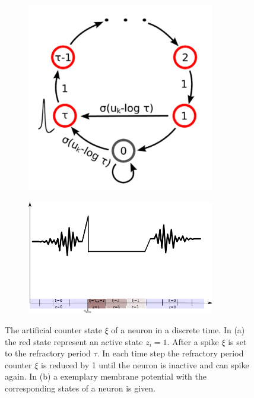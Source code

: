 \begin{figure}
	\centering
	\begin{subfigure}[t]{.39\textwidth}
  		\centering
  		\includegraphics[width=0.9\textwidth]{imgs/snn_sample2.png}
  		\label{fig:sub1}
	\end{subfigure}
	\begin{subfigure}[t]{.59\textwidth}
  		\centering
  		\includegraphics[width=0.9\textwidth]{imgs/sampl_bsp.png}
  		\label{fig:sub1}
	\end{subfigure}
    \caption{The artificial counter state $\xi$ of a neuron in a discrete time. In (a) the red state represent an active state $z_i = 1$. After a spike $\xi$ is set to the refractory period $\tau$. In each time step the refractory period counter $\xi$ is reduced by 1 until the neuron is inactive and can spike again. In (b) a exemplary membrane potential with the corresponding states of a neuron is given.}
	\label{fig:snnsamp2}
\end{figure}




